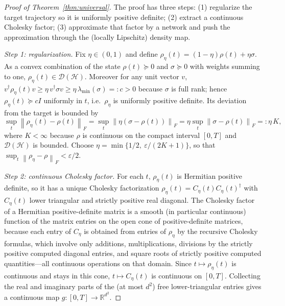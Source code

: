 \documentclass[11pt]{article}
\newcommand{\R}{\mathbb{R}}
\newcommand{\calD}{\mathcal{D}}
\newcommand{\eps}{\varepsilon}
\newcommand{\norm}[1]{\left\lVert #1 \right\rVert}
\newcommand{\hilb}{\mathcal{H}}
\begin{document}
\begin{proof}[Proof of Theorem~\ref{thm:universal}]
The proof has three steps: (1) regularize the target trajectory so it is uniformly positive definite; (2) extract a continuous Cholesky factor; (3) approximate that factor by a network and push the approximation through the (locally Lipschitz) density map.

\emph{Step 1: regularization.} Fix $\eta\in(0,1)$ and define $\rho_\eta(t)=(1-\eta)\rho(t)+\eta\sigma$. As a convex combination of the state $\rho(t)\succeq0$ and $\sigma\succeq0$ with weights summing to one, $\rho_\eta(t)\in\calD(\hilb)$. Moreover for any unit vector $v$, $v^\dagger\rho_\eta(t)v\ge\eta\, v^\dagger\sigma v\ge\eta\,\lambda_{\min}(\sigma)=:c>0$ because $\sigma$ is full rank; hence $\rho_\eta(t)\succeq cI$ uniformly in $t$, i.e.\ $\rho_\eta$ is uniformly positive definite. Its deviation from the target is bounded by
\[
\sup_t\norm{\rho_\eta(t)-\rho(t)}_F=\sup_t\norm{\eta(\sigma-\rho(t))}_F=\eta\sup_t\norm{\sigma-\rho(t)}_F=:\eta\,K,
\]
where $K<\infty$ because $\rho$ is continuous on the compact interval $[0,T]$ and $\calD(\hilb)$ is bounded. Choose $\eta=\min\{1/2,\ \eps/(2K+1)\}$, so that $\sup_t\norm{\rho_\eta-\rho}_F<\eps/2$.

\emph{Step 2: continuous Cholesky factor.} For each $t$, $\rho_\eta(t)$ is Hermitian positive definite, so it has a unique Cholesky factorization $\rho_\eta(t)=C_\eta(t)C_\eta(t)^\dagger$ with $C_\eta(t)$ lower triangular and strictly positive real diagonal. The Cholesky factor of a Hermitian positive-definite matrix is a smooth (in particular continuous) function of the matrix entries on the open cone of positive-definite matrices, because each entry of $C_\eta$ is obtained from entries of $\rho_\eta$ by the recursive Cholesky formulas, which involve only additions, multiplications, divisions by the strictly positive computed diagonal entries, and square roots of strictly positive computed quantities---all continuous operations on that domain. Since $t\mapsto\rho_\eta(t)$ is continuous and stays in this cone, $t\mapsto C_\eta(t)$ is continuous on $[0,T]$. Collecting the real and imaginary parts of the (at most $d^2$) free lower-triangular entries gives a continuous map $g:[0,T]\to\R^{d^2}$.


\end{proof}
\end{document}
